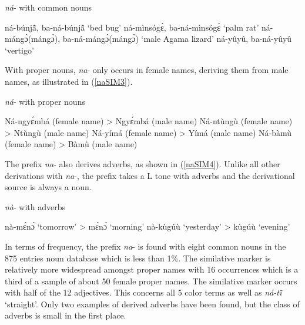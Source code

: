 \begin{exe}
\ex\label{naSIM2} {\itshape ná}- with common nouns
\begin{xlist}
\ex ná-búnjã̂, ba-ná-búnjã̂ `bed bug'
\ex ná-mìnsógɛ̀, ba-ná-mìnsógɛ̀ `palm rat'
\ex ná-mángɔ̀(mángɔ̀), ba-ná-mángɔ̀(mángɔ̀) `male Agama lizard'
\ex ná-yûyû, ba-ná-yûyû `vertigo'
\end{xlist}
\end{exe}

\noindent With proper nouns, {\itshape na}- only occurs in female names, deriving them from male names, as illustrated in (\ref{naSIM3}). 

\begin{exe}
\ex\label{naSIM3}  {\itshape ná}- with proper nouns
\begin{xlist}
\ex Ná-ngyɛ́mbá (female name) > Ngyɛ́mbá (male name)  
\ex Ná-ntùngù (female name)  > Ntùngù (male name)
\ex Ná-yímá (female name) > Yímá (male name)
\ex Ná-bàmù (female name) > Bàmù (male name)
\end{xlist}
\end{exe}

The prefix {\itshape na}- also derives adverbs, as shown in (\ref{naSIM4}). Unlike all other derivations with {\itshape na}-, the prefix takes a L tone with adverbs and the derivational source is always a noun.

\begin{exe}
\ex\label{naSIM4}  {\itshape nà}- with adverbs
\begin{xlist}
\ex nà-mɛ́nɔ́ `tomorrow' > mɛ́nɔ́ `morning'
\ex nà-kùgúù `yesterday' > kùgúù `evening'
\end{xlist}
\end{exe}


In terms of frequency, the prefix {\itshape na}- is found with eight common nouns in the 875 entries noun database which is less than 1\%. The similative marker is relatively more widespread amongst proper names with 16 occurrences which is a third of a sample of about 50 female proper names. The similative marker occurs with half of the 12 adjectives. This concerns all 5 color terms as well as {\itshape ná-tĩ̂} `straight'. Only two examples of derived adverbs have been found, but the class of adverbs is small in the first place.



